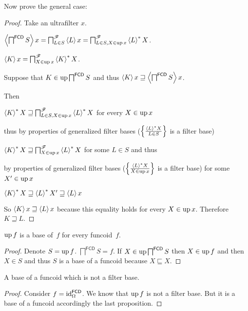 Now prove the general case:

\begin{proof}
  Take an ultrafilter $x$.
  
  $\left\langle \bigsqcap^{\mathsf{FCD}} S\right\rangle x =
  \bigsqcap^{\mathscr{F}}_{L \in S} \left\langle L\right\rangle x =
  \bigsqcap^{\mathscr{F}}_{L \in S, X \in \operatorname{up} x} \left\langle L\right\rangle ^{\ast} X$.
  
  $\left\langle K\right\rangle x = \bigsqcap^{\mathscr{F}}_{X \in \operatorname{up} x} \left\langle K\right\rangle ^{\ast}X$.
  
  Suppose that $K \in \operatorname{up} \bigsqcap^{\mathsf{FCD}} S$ and thus
  $\left\langle K\right\rangle x \sqsupseteq \left\langle 
  \bigsqcap^{\mathsf{FCD}} S \right\rangle x$.
  
  Then
  
  $\left\langle K\right\rangle ^{\ast} X \sqsupseteq \bigsqcap^{\mathscr{F}}_{L \in S, X
  \in \operatorname{up} x} \left\langle L\right\rangle ^{\ast} X$ for every $X \in \operatorname{up} x$
  
  thus by properties of generalized filter bases ($\left\{ \frac{ \left\langle L\right\rangle ^{\ast}X
  }{ L \in S }\right\}$ is a filter base)
  
  $\left\langle K\right\rangle ^{\ast} X \sqsupseteq \bigsqcap^{\mathscr{F}}_{X \in
  \operatorname{up} x} \left\langle L\right\rangle ^{\ast} X$ for some $L \in S$ and thus
  
  by properties of generalized filter bases ($\left\{ \frac{ \left\langle L\right\rangle ^{\ast}
  X }{ X \in \operatorname{up} x }\right\}$ is a filter base) for some $X' \in \operatorname{up} x$
  
  $\left\langle K\right\rangle ^{\ast} X \sqsupseteq \left\langle L\right\rangle ^{\ast} X'
  \sqsupseteq \left\langle L\right\rangle x$
  
  So $\left\langle K\right\rangle x \sqsupseteq \left\langle L\right\rangle x$ because this
  equality holds for every $X \in \operatorname{up} x$. Therefore $K \sqsupseteq L$.
\end{proof}

\begin{prop}
$\operatorname{up} f$ is a base of~$f$ for every funcoid~$f$.
\end{prop}

\begin{proof}
Denote $S=\operatorname{up} f$.
$\bigsqcap^{\mathsf{FCD}} S = f$.
If $X \in \operatorname{up} \bigsqcap^{\mathsf{FCD}} S$ then $X \in \operatorname{up}
f$ and then $X \in S$ and thus $S$ is a base of a funcoid because $X
\sqsubseteq X$.
\end{proof}

\begin{example}
A base of a funcoid which is not a filter base.
\end{example}

\begin{proof}
Consider $f=\operatorname{id}^{\mathsf{FCD}}_{\Omega}$. We know that $\operatorname{up} f$ is not a
filter base. But it is a base of a funcoid accordingly the last proposition.
\end{proof}

